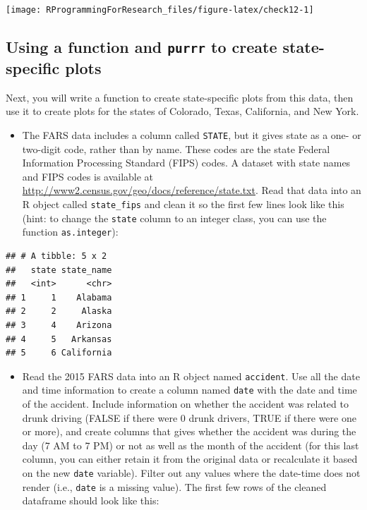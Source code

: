 \documentclass[]{book}
\providecommand{\tightlist}{%
  \setlength{\itemsep}{0pt}\setlength{\parskip}{0pt}}
\theoremstyle{definition}
\theoremstyle{definition}
\theoremstyle{definition}
\theoremstyle{remark}
\begin{document}
\begin{center}\texttt{[image: RProgrammingForResearch\_files/figure-latex/check12-1]} \end{center}

\subsection{\texorpdfstring{Using a function and \texttt{purrr} to
create state-specific
plots}{Using a function and purrr to create state-specific plots}}\label{using-a-function-and-purrr-to-create-state-specific-plots}

Next, you will write a function to create state-specific plots from this
data, then use it to create plots for the states of Colorado, Texas,
California, and New York.

\begin{itemize}
\tightlist
\item
  The FARS data includes a column called \texttt{STATE}, but it gives
  state as a one- or two-digit code, rather than by name. These codes
  are the state Federal Information Processing Standard (FIPS) codes. A
  dataset with state names and FIPS codes is available at
  \url{http://www2.census.gov/geo/docs/reference/state.txt}. Read that
  data into an R object called \texttt{state\_fips} and clean it so the
  first few lines look like this (hint: to change the \texttt{state}
  column to an integer class, you can use the function
  \texttt{as.integer}):
\end{itemize}

\begin{verbatim}
## # A tibble: 5 x 2
##   state state_name
##   <int>      <chr>
## 1     1    Alabama
## 2     2     Alaska
## 3     4    Arizona
## 4     5   Arkansas
## 5     6 California
\end{verbatim}

\begin{itemize}
\tightlist
\item
  Read the 2015 FARS data into an R object named \texttt{accident}. Use
  all the date and time information to create a column named
  \texttt{date} with the date and time of the accident. Include
  information on whether the accident was related to drunk driving
  (FALSE if there were 0 drunk drivers, TRUE if there were one or more),
  and create columns that gives whether the accident was during the day
  (7 AM to 7 PM) or not as well as the month of the accident (for this
  last column, you can either retain it from the original data or
  recalculate it based on the new \texttt{date} variable). Filter out
  any values where the date-time does not render (i.e., \texttt{date} is
  a missing value). The first few rows of the cleaned dataframe should
  look like this:
\end{itemize}
\end{document}
